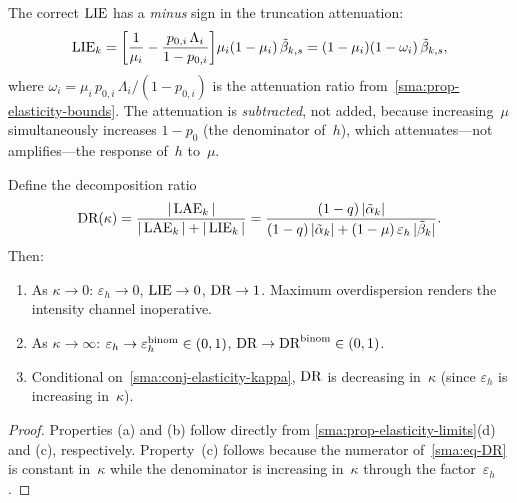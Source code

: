 
\begin{remark}
  \label{sma:rem-lie-sign}
  The correct $\operatorname{LIE}$ has a \emph{minus} sign in the truncation attenuation:
  \begin{equation}\label{sma:eq-lie-corrected}
    \operatorname{LIE}_k
    = \biggl[\frac{1}{\mu_i}
      - \frac{p_{0,i}\,\Lambda_i}{1-p_{0,i}}\biggr]
      \mu_i(1-\mu_i)\,\tilde{\beta}_{k,s}
    = (1-\mu_i)(1-\omega_i)\,\tilde{\beta}_{k,s},
  \end{equation}
  where $\omega_i = \mu_i\,p_{0,i}\,\Lambda_i/(1-p_{0,i})$ is the
  attenuation ratio from~\cref{sma:prop-elasticity-bounds}. The
  attenuation is \emph{subtracted}, not added, because increasing~$\mu$
  simultaneously increases $1-p_0$ (the denominator of~$h$), which
  attenuates---not amplifies---the response of~$h$ to~$\mu$.
\end{remark}


\begin{proposition}\label{sma:prop-DR}
  Define the decomposition ratio
  \begin{equation}\label{sma:eq-DR}
    \textup{DR}(\kappa)
    = \frac{|\operatorname{LAE}_k|}{|\operatorname{LAE}_k| + |\operatorname{LIE}_k|}
    = \frac{(1-q)\,|\tilde{\alpha}_k|}
           {(1-q)\,|\tilde{\alpha}_k|
            + (1-\mu)\,\varepsilon_h\,|\tilde{\beta}_k|}.
  \end{equation}
  Then:
  \begin{enumerate}[label=\textup{(\alph*)}]
    \item As $\kappa \to 0$:
      $\varepsilon_h \to 0$, $\operatorname{LIE} \to 0$, $\textup{DR} \to 1$.
      Maximum overdispersion renders the intensity channel inoperative.
    \item As $\kappa \to \infty$:
      $\varepsilon_h \to \varepsilon_h^{\textup{binom}} \in (0,1)$,
      $\textup{DR} \to \textup{DR}^{\textup{binom}} \in (0,1)$.
    \item Conditional on~\cref{sma:conj-elasticity-kappa},
      $\textup{DR}$ is decreasing in~$\kappa$
      (since $\varepsilon_h$ is increasing in~$\kappa$).
  \end{enumerate}
\end{proposition}

\begin{proof}
  Properties (a) and (b) follow directly from
  \cref{sma:prop-elasticity-limits}(d) and (c), respectively.
  Property~(c) follows because the numerator of~\eqref{sma:eq-DR} is
  constant in~$\kappa$ while the denominator is increasing in~$\kappa$
  through the factor~$\varepsilon_h$.
\end{proof}

